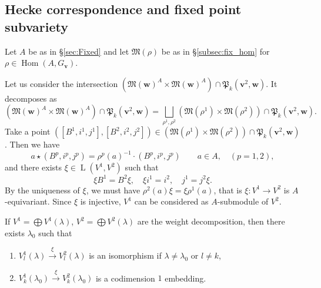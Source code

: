 \documentclass[12pt]{amsart}
\def\frak{\mathfrak}
\renewcommand{\labelenumi}{(\theenumi)}%
\newenvironment{aenume}{%
  \begin{enumerate}%
  \renewcommand{\theenumi}{\alph{enumi}}%
  \renewcommand{\labelenumi}{(\theenumi)}%
  }{\end{enumerate}}
\theoremstyle{definition}
\theoremstyle{remark}
\numberwithin{equation}{subsection}
\newcommand{\secref}[1]{\S\ref{#1}}
\newcommand{\subsecref}[1]{\S\ref{#1}}
\newcommand{\Hom}{\operatorname{Hom}}
\newcommand{\vin}{\operatorname{in}} %
\newcommand{\vout}{\operatorname{out}} %
\newcommand{\M}{{\frak M}} %
\newcommand{\bv}{{\mathbf v}} %
\newcommand{\bw}{{\mathbf w}} %
\newcommand{\Pa}{{\frak P}} %
\newcommand{\HomL}{\operatorname{L}}
\newcommand{\Mw}{\M(\bw)}
\begin{document}
\subsection{Hecke correspondence and fixed point subvariety}
\label{subsec:HeckeFix}
Let $A$ be as in \secref{sec:Fixed} and let $\M(\rho)$ be as in
\subsecref{subsec:fix_hom} for $\rho\in\Hom(A,G_\bv)$.

Let us consider the intersection
$(\Mw^A\times\Mw^A)\cap\Pa_k(\bv^2,\bw)$.
It decomposes as
\begin{equation*}
  (\Mw^A\times\Mw^A)\cap\Pa_k(\bv^2,\bw)
  = \bigsqcup_{\rho^1,\rho^2}
     (\M(\rho^1)\times\M(\rho^2))\cap \Pa_k(\bv^2,\bw).
\end{equation*}
Take a point $([B^1,i^1,j^1], [B^2,i^2,j^2])\in
(\M(\rho^1)\times\M(\rho^2))\cap \Pa_k(\bv^2,\bw)$.
Then we have
\begin{equation*}
  a \star (B^p,i^p,j^p) = \rho^p(a)^{-1} \cdot (B^p,i^p,j^p)
   \qquad a\in A,\quad (p = 1,2),
\end{equation*}
and there exists $\xi\in\HomL(V^1,V^2)$ such that
\begin{equation*}
  \xi B^1 = B^2 \xi, \quad
  \xi i^1 = i^2, \quad
  j^1 = j^2 \xi.
\end{equation*}
By the uniqueness of $\xi$, we must have $\rho^2(a)\xi =
\xi\rho^1(a)$, that is $\xi\colon V^1\to V^2$ is $A$-equivariant.
Since $\xi$ is injective, $V^1$ can be considered as $A$-submodule of
$V^2$.

If $V^1 = \bigoplus V^1(\lambda)$, $V^2 = \bigoplus V^2(\lambda)$ are
the weight decomposition, then there exists $\lambda_0$ such that
\begin{aenume}
\item $V^1_l(\lambda) \xrightarrow{\xi} V^2_l(\lambda)$ is an isomorphism
if $\lambda\neq \lambda_0$ or $l\neq k$,
\item $V^1_k(\lambda_0) \xrightarrow{\xi} V^2_k(\lambda_0)$ is a
codimension $1$ embedding.
\end{aenume}
\end{document}
